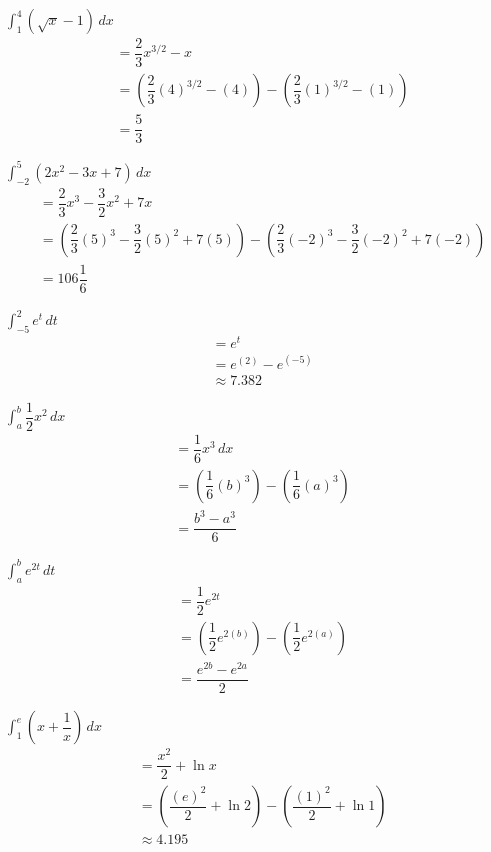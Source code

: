 \documentclass[12pt]{article}
\newenvironment{problem}[2][]{
    \begin{trivlist}
        \item[
            {\bfseries #1}
            {\bfseries #2.}
        ]
}{\end{trivlist}}
\begin{document}
\begin{problem}{45}
$\displaystyle\int_1^4 (\sqrt{x} - 1) \, dx$
\begin{align}
&= \dfrac{2}{3} x^{3/2} - x \\
&= \left(\dfrac{2}{3} (4)^{3/2} - (4)\right) - \left(\dfrac{2}{3} (1)^{3/2} - (1)\right) \\
&= \dfrac{5}{3}
\end{align}
\end{problem}

\begin{problem}{47}
$\displaystyle\int_{-2}^5 (2x^2 - 3x + 7) \, dx$
\begin{align}
&= \dfrac{2}{3} x^3 - \dfrac{3}{2} x^2 + 7x \\
&= \left(\dfrac{2}{3} (5)^3 - \dfrac{3}{2} (5)^2 + 7(5)\right) - \left(\dfrac{2}{3} (-2)^3 - \dfrac{3}{2} (-2)^2 + 7(-2)\right) \\
&= 106 \dfrac{1}{6}
\end{align}
\end{problem}

\begin{problem}{49}
$\displaystyle\int_{-5}^2 e^t \, dt$
\begin{align}
&= e^t \\
&= e^{(2)} - e^{(-5)} \\
&\approx 7.382
\end{align}
\end{problem}

\begin{problem}{51}
$\displaystyle\int_a^b \dfrac{1}{2} x^2 \, dx$
\begin{align}
&= \dfrac{1}{6} x^3 \, dx \\
&= \left(\dfrac{1}{6} (b)^3\right) - \left(\dfrac{1}{6} (a)^3\right) \\
&= \dfrac{b^3 - a^3}{6}
\end{align}
\end{problem}

\begin{problem}{53}
$\displaystyle\int_a^b e^{2t} \, dt$
\begin{align}
&= \dfrac{1}{2} e^{2t} \\
&= \left(\dfrac{1}{2} e^{2(b)}\right) - \left(\dfrac{1}{2} e^{2(a)}\right) \\
&= \dfrac{e^{2b} - e^{2a}}{2}
\end{align}
\end{problem}

\begin{problem}{55}
$\displaystyle\int_1^e \left(x + \dfrac{1}{x}\right) \, dx$
\begin{align}
&= \dfrac{x^2}{2} + \ln{x} \\
&= \left(\dfrac{(e)^2}{2} + \ln{2}\right) - \left(\dfrac{(1)^2}{2} + \ln{1}\right) \\
&\approx 4.195
\end{align}
\end{problem}
\end{document}
